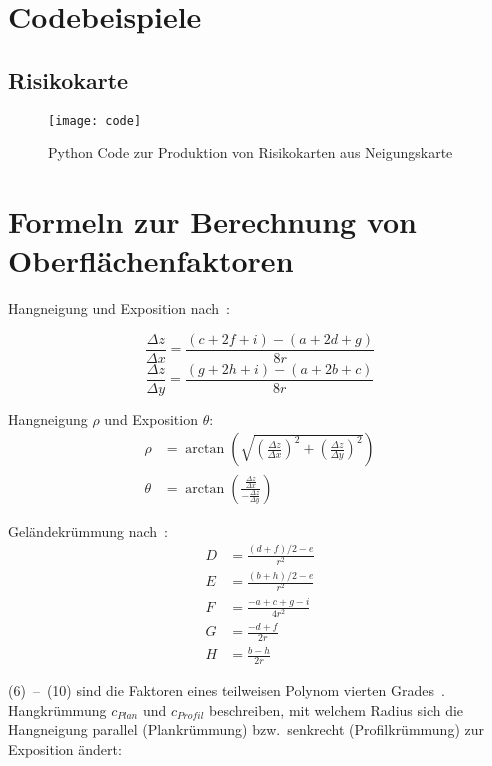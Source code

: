 
\section{Codebeispiele}
\subsection{Risikokarte}
\begin{figure}[H]
  \centering
  \texttt{[image: code]}
  \caption{Python Code zur Produktion von Risikokarten aus Neigungskarte}\label{fig:python}
\end{figure}
\section{Formeln zur Berechnung von Oberflächenfaktoren}
Hangneigung und Exposition nach~\cite{gisslopeaspect}:

\begin{equation} \label{eq1}
  \frac{\Delta z}{\Delta x} = \frac{(c + 2f + i) - (a + 2d + g)}{8r}
\end{equation}
\begin{equation} \label{eq2}
  \frac{\Delta z}{\Delta y} = \frac{(g + 2h + i) - (a + 2b + c)}{8r}
\end{equation}

Hangneigung $\rho$ und Exposition $\theta$:
\begin{align}
  \rho &= \arctan \left( \sqrt{
    {\left( \frac{\Delta z}{\Delta x}\right)}^2 + 
    {\left(\frac{\Delta z}{\Delta y}\right)}^2}
  \right)\\
  \theta &= \arctan\left(\frac{\frac{\Delta z}{\Delta x}}{-\frac{\Delta z}{\Delta y}}\right)
\end{align}

Geländekrümmung nach~\cite{gismath}:
\begin{align}
  D &= \frac{{(d + f) / 2 - e}}{{r^2}} \\
  E &= \frac{{(b + h) / 2 - e}}{{r^2}} \\
  F &= \frac{{-a + c + g - i}}{{4r^2}} \\
  G &= \frac{{-d + f}}{{2r}} \\
  H &= \frac{{b - h}}{{2r}}
\end{align}

(6)~--~(10) sind die Faktoren eines teilweisen Polynom vierten Grades~\cite{gismath}.
Hangkrümmung $c_{Plan}$ und $c_{Profil}$ beschreiben, mit welchem Radius sich die Hangneigung parallel (Plankrümmung) bzw.\ senkrecht (Profilkrümmung) zur Exposition ändert:

